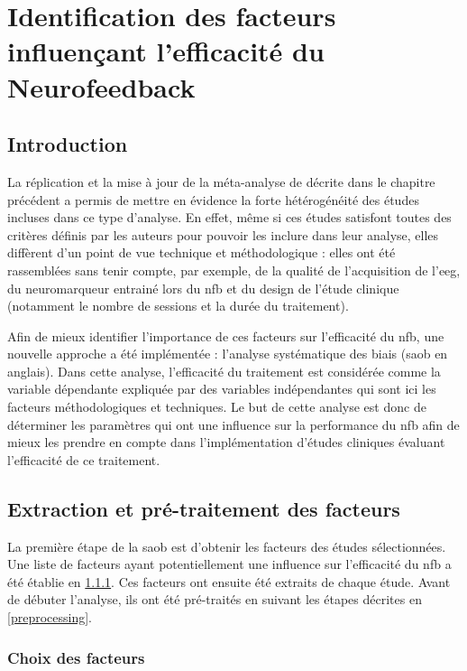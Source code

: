 \chapter{Identification des facteurs influençant l'efficacité du Neurofeedback} \label{ch-saob}

\section*{Introduction}

La réplication et la mise à jour de la méta-analyse de \citet{Cortese2016} décrite dans le chapitre précédent a permis de mettre en évidence la forte 
hétérogénéité des études incluses dans ce type d'analyse. En effet, même si ces études satisfont toutes des critères définis par les auteurs pour pouvoir
les inclure dans leur analyse, elles diffèrent d'un point de vue technique et méthodologique : elles ont été rassemblées sans tenir compte, par exemple, 
de la qualité de l'acquisition de l'\gls{eeg}, du neuromarqueur entrainé lors du \gls{nfb} et du design de l'étude clinique (notamment le nombre de sessions 
et la durée du traitement). 

Afin de mieux identifier l'importance de ces facteurs sur l'efficacité du \gls{nfb}, une nouvelle approche a été implémentée : l'analyse systématique des biais 
(\gls{saob} en anglais). Dans cette analyse, l'efficacité du traitement est considérée comme la variable dépendante expliquée par des variables indépendantes 
qui sont ici les facteurs méthodologiques et techniques. Le but de cette analyse est donc de déterminer les paramètres qui ont une influence sur la performance du 
\gls{nfb} afin de mieux les prendre en compte dans l'implémentation d'études cliniques évaluant l'efficacité de ce traitement. 
\clearpage

\section{Extraction et pré-traitement des facteurs}

La première étape de la \gls{saob} est d'obtenir les facteurs des études sélectionnées. Une liste de facteurs ayant potentiellement une influence sur 
l'efficacité du \gls{nfb} a été établie en \ref{choix_des_facteurs}. Ces facteurs ont ensuite été extraits de chaque étude. Avant de débuter l'analyse, ils ont été pré-traités en 
suivant les étapes décrites en \ref{preprocessing}. 

\subsection{Choix des facteurs} \label{choix_des_facteurs}

